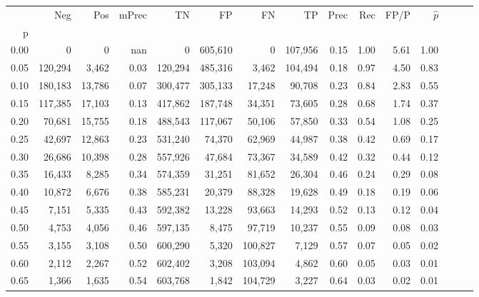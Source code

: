 \begin{tabular}{rrrrrrrrrrrrrrr}
\toprule
{} &      Neg &     Pos & mPrec &       TN &       FP &       FN &       TP &  Prec &   Rec &  FP/P & $\hat{p}$ \\
p    &          &         &       &          &          &          &          &       &       &       &           \\
\midrule
0.00 &        0 &       0 &   nan &        0 &  605,610 &        0 &  107,956 &  0.15 &  1.00 &  5.61 &      1.00 \\
0.05 &  120,294 &   3,462 &  0.03 &  120,294 &  485,316 &    3,462 &  104,494 &  0.18 &  0.97 &  4.50 &      0.83 \\
0.10 &  180,183 &  13,786 &  0.07 &  300,477 &  305,133 &   17,248 &   90,708 &  0.23 &  0.84 &  2.83 &      0.55 \\
0.15 &  117,385 &  17,103 &  0.13 &  417,862 &  187,748 &   34,351 &   73,605 &  0.28 &  0.68 &  1.74 &      0.37 \\
0.20 &   70,681 &  15,755 &  0.18 &  488,543 &  117,067 &   50,106 &   57,850 &  0.33 &  0.54 &  1.08 &      0.25 \\
0.25 &   42,697 &  12,863 &  0.23 &  531,240 &   74,370 &   62,969 &   44,987 &  0.38 &  0.42 &  0.69 &      0.17 \\
0.30 &   26,686 &  10,398 &  0.28 &  557,926 &   47,684 &   73,367 &   34,589 &  0.42 &  0.32 &  0.44 &      0.12 \\
0.35 &   16,433 &   8,285 &  0.34 &  574,359 &   31,251 &   81,652 &   26,304 &  0.46 &  0.24 &  0.29 &      0.08 \\
0.40 &   10,872 &   6,676 &  0.38 &  585,231 &   20,379 &   88,328 &   19,628 &  0.49 &  0.18 &  0.19 &      0.06 \\
0.45 &    7,151 &   5,335 &  0.43 &  592,382 &   13,228 &   93,663 &   14,293 &  0.52 &  0.13 &  0.12 &      0.04 \\
0.50 &    4,753 &   4,056 &  0.46 &  597,135 &    8,475 &   97,719 &   10,237 &  0.55 &  0.09 &  0.08 &      0.03 \\
0.55 &    3,155 &   3,108 &  0.50 &  600,290 &    5,320 &  100,827 &    7,129 &  0.57 &  0.07 &  0.05 &      0.02 \\
0.60 &    2,112 &   2,267 &  0.52 &  602,402 &    3,208 &  103,094 &    4,862 &  0.60 &  0.05 &  0.03 &      0.01 \\
0.65 &    1,366 &   1,635 &  0.54 &  603,768 &    1,842 &  104,729 &    3,227 &  0.64 &  0.03 &  0.02 &      0.01 \\

\end{tabular}
